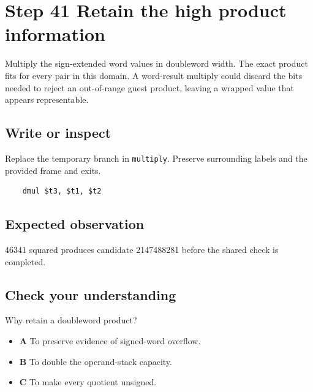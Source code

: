 \section{Step 41 Retain the high product information}\label{vm-s41}

Multiply the sign-extended word values in doubleword width. The exact product fits for every pair in this domain. A word-result multiply could discard the bits needed to reject an out-of-range guest product, leaving a wrapped value that appears representable.

\subsection{Write or inspect}
Replace the temporary branch in \texttt{multiply}. Preserve surrounding labels and the provided frame and exits.

\begin{verbatim}
    dmul $t3, $t1, $t2
\end{verbatim}
\subsection{Expected observation}
46341 squared produces candidate 2147488281 before the shared check is completed.

\subsection{Check your understanding}
Why retain a doubleword product?

\begin{itemize}
  \item \textbf{A} To preserve evidence of signed-word overflow.
  \item \textbf{B} To double the operand-stack capacity.
  \item \textbf{C} To make every quotient unsigned.
\end{itemize}
